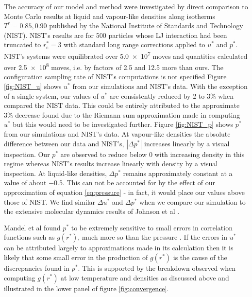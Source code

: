 \documentclass[10pt, twocolumn]{revtex4}    %
\begin{document}
The accuracy of our model and method were investigated by direct comparison to Monte Carlo results at liquid and vapour-like densities along isotherms $T^{*} = 0.85, 0.90$ published by the National Institute of Standards and Technology (NIST). NIST's results are for \num{500} particles whose LJ interaction had been truncated to $r_\text{c}^{*}=3$ with standard long range corrections applied to $u^{*}$ and $p^{*}$. NIST's systems were equilibrated over \num{5.0e7} moves and quantities calculated over \num{2.5e8} moves, i.e. by factors of \num{2.5} and \num{12.5} more than ours. The configuration sampling rate of NIST's computations is not specified \cite{NIST}
Figure \ref{fig:NIST_u} shows $u^{*}$ from our simulations and NIST's data. With the exception of a single system, our values of $u^{*}$ are consistently reduced by \num{2} to \num{3}\% when compared the NIST data. This could be entirely attributed to the approximate \num{3}\% decrease found due to the Riemann sum approximation made in computing $u^{*}$ but this would need to be investigated further.
Figure \ref{fig:NIST_p} shows $p^{*}$ from our simulations and NIST's data. At vapour-like densities the absolute difference between our data and NIST's, $|\Delta{}p^{*}|$ increases linearly by a visual inspection. Our $p^{*}$ are observed to reduce below \num{0} with increasing density in this regime whereas NIST's results increase linearly with density by a visual inspection. At liquid-like densities, $\Delta{}p^{*}$ remains approximately constant at a value of about \num{-0.5}. This can not be accounted for by the effect of our approximation of equation \ref{eq:pressure} - in fact, it would place our values above those of NIST.
We find similar $\Delta{}u^{*}$ and $\Delta{}p^{*}$ when we compare our simulation to the extensive molecular dynamics results of Johnson et al \cite{Johnson}.

Mandel et al found $p^{*}$ to be extremely sensitive to small errors in correlation functions such as $g(r^{*})$, much more so than the pressure \cite{MandelEtAl}. If the errors in $u^{*}$ can be attributed largely to approximations made in its calculation then it is likely that some small error in the production of $g(r^{*})$ is the cause of the discrepancies found in $p^{*}$. This is supported by the breakdown observed when computing $g(r^{*})$ at low temperature and densities as discussed above and illustrated in the lower panel of figure \ref{fig:convergence}.

\end{document}
